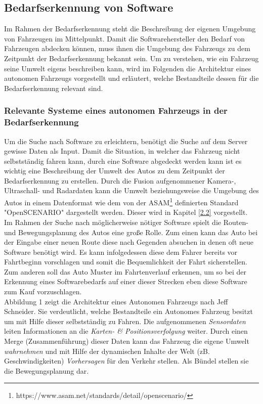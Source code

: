 \subsection{Bedarfserkennung von Software}\label{bedarfserkennung}
Im Rahmen der Bedarfserkennung steht die Beschreibung der eigenen Umgebung von Fahrzeugen im Mittelpunkt. Damit die Softwarehersteller den Bedarf von Fahrzeugen abdecken können, muss ihnen die Umgebung des Fahrzeugs zu dem Zeitpunkt der Bedarfserkennung bekannt sein. Um zu verstehen, wie ein Fahrzeug seine Umwelt eigens beschreiben kann, wird im Folgenden die Architektur eines autonomen Fahrzeugs vorgestellt und erläutert, welche Bestandteile dessen für die Bedarfserkennung relevant sind. 
\subsubsection{Relevante Systeme eines autonomen Fahrzeugs in der Bedarfserkennung}
Um die Suche nach Software zu erleichtern, benötigt die Suche auf dem Server gewisse Daten als Input. Damit die Situation, in welcher das Fahrzeug nicht selbstständig fahren kann, durch eine Software abgedeckt werden kann ist es wichtig eine Beschreibung der Umwelt des Autos zu dem Zeitpunkt der Bedarfserkennung zu erstellen. Durch die Fusion aufgenommener Kamera-, Ultraschall- und Radardaten kann die Umwelt beziehungsweise die Umgebung des Autos in einem Datenformat wie dem von der ASAM\footnote[1.]{https://www.asam.net/standards/detail/openscenario/} definierten Standard "OpenSCENARIO"\cite{b35} dargestellt werden. Dieser wird in Kapitel \ref{2.2} vorgestellt.\\
Im Rahmen der Suche nach möglicherweise nötiger Software spielt die Routen- und Bewegungsplanung des Autos eine große Rolle. Zum einen kann das Auto bei der Eingabe einer neuen Route diese nach Gegenden absuchen in denen oft neue Software benötigt wird. Es kann infolgedessen diese dem Fahrer bereits vor Fahrtbeginn vorschlagen und somit die Bequemlichkeit der Fahrt sicherstellen. Zum anderen soll das Auto  Muster im Fahrtenverlauf erkennen, um so bei der Erkennung eines Softwarebedarfs auf einer dieser Strecken eben diese Software zum Kauf vorzuschlagen.\\
Abbildung 1 zeigt die Architektur eines Autonomen Fahrzeugs nach Jeff Schneider. Sie verdeutlicht, welche Bestandteile ein Autonomes Fahrzeug besitzt um mit Hilfe dieser selbstständig zu Fahren. Die aufgenommenen \textit{Sensordaten} leiten Informationen an die \textit{Karten- \& Positionsverfolgung} weiter. Durch einen Merge (Zusammenführung) dieser Daten kann das Fahrzeug die eigene Umwelt \textit{wahrnehmen} und mit Hilfe der dynamischen Inhalte der Welt (zB. Geschwindigkeiten) \textit{Vorhersagen} für den Verkehr stellen. Als Bündel stellen sie die Bewegungsplanung dar.
